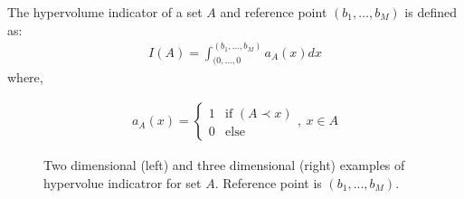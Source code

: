 The hypervolume indicator of a set $A$  and reference point $(b_1,...,b_M)$ is defined as:
\begin{eqnarray}
	I(A)=\int _{(0,...,0}^{(b_1,...,b_M)}a_A(x)dx 
\end{eqnarray}  
where,

\begin{eqnarray}
	\nonumber
	a_A(x) = \left\{ \begin{array}{ll}
    1 & \mbox{if $(A\prec{x})$}\\
    0 & \mbox{else}\end{array} \right.
    ,~x\in A
\end{eqnarray}    


\begin{figure}[h!]
\begin{minipage}[b]{0.5\linewidth}
 \centering
\end{minipage}
\begin{minipage}[b]{0.5\linewidth}
 \centering
\end{minipage}
\caption{Two dimensional (left) and three dimensional (right) examples of hypervolue indicatror for set $A$. Reference point is $(b_1,...,b_M)$.}
\label{hyperV}
\end{figure}

